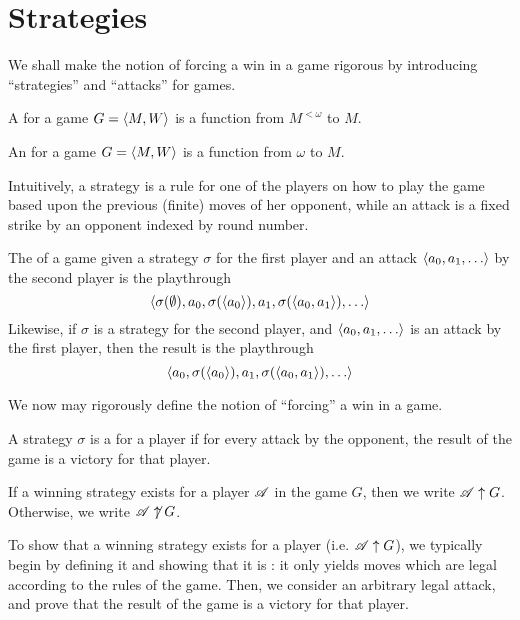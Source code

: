 \section{Strategies}

We shall make the notion of forcing a win in a game rigorous by introducing
``strategies'' and ``attacks'' for games.

\begin{defn}
  A  for a game $G=\langle M,W\rangle$ is a function
  from $M^{<\omega}$ to $M$.
\end{defn}

\begin{defn}
  An  for a game $G=\langle M,W\rangle$ is a function
  from $\omega$ to $M$.
\end{defn}

Intuitively, a strategy is a rule for one of the players on how to play
the game based upon the previous (finite) moves of her opponent, while an
attack is a fixed strike by an opponent indexed by round number.


\begin{defn}
  The  of a game given a strategy $\sigma$ for the first player
  and an attack $\<a_0,a_1,\dots\>$ by the second player is the playthrough
    \[
      \<
        \sigma(\emptyset),
        a_0,
        \sigma(\<a_0\>),
        a_1,
        \sigma(\<a_0,a_1\>),
        \dots
      \>
    \]
  Likewise, if $\sigma$ is a strategy for the second player, and
  $\<a_0,a_1,\dots\>$ is an attack by the first player, then the result is
  the playthrough
    \[
      \<
        a_0,
        \sigma(\<a_0\>),
        a_1,
        \sigma(\<a_0,a_1\>),
        \dots
      \>
    \]
\end{defn}

We now may rigorously define the notion of ``forcing'' a win in a game.

\begin{defn}
  A strategy $\sigma$ is a  for a player if for
  every attack by the opponent, the result of the game is a victory
  for that player.

  If a winning strategy exists for a player $\mathscr{A}$ in the game $G$, then we
  write $\mathscr{A} \uparrow G$. Otherwise, we write $\mathscr{A} \not\uparrow G$.
\end{defn}

To show that a winning strategy exists for a player (i.e. $\mathscr{A}\uparrow G$),
we typically begin by
defining it and showing that it is : it only yields moves which are
legal according to the rules of the game. Then, we consider an arbitrary
legal attack, and prove that the result of the game is a victory for that
player.

